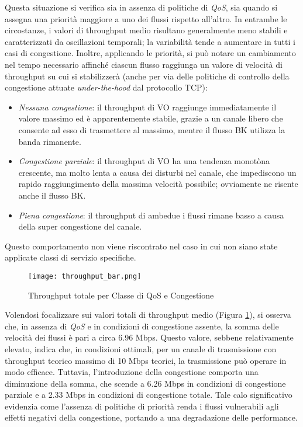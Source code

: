 Questa situazione si verifica sia in assenza di politiche di \textit{QoS}, sia quando si assegna una priorità maggiore a uno dei flussi rispetto all'altro. In entrambe le circostanze, i valori di throughput medio risultano generalmente meno stabili e caratterizzati da oscillazioni temporali; la variabilità tende a aumentare in tutti i casi di congestione. Inoltre, applicando le priorità, si può notare un cambiamento nel tempo necessario affinché ciascun flusso raggiunga un valore di velocità di throughput su cui si stabilizzerà (anche per via delle politiche di controllo della congestione attuate \textit{under-the-hood} dal protocollo TCP):
\begin{itemize}
    \item \textit{Nessuna congestione}: il throughput di VO raggiunge immediatamente il valore massimo ed è apparentemente stabile, grazie a un canale libero che consente ad esso di trasmettere al massimo, mentre il flusso BK utilizza la banda rimanente.
    \item \textit{Congestione parziale}: il throughput di VO ha una tendenza monotòna crescente, ma molto lenta a causa dei disturbi nel canale, che impediscono un rapido raggiungimento della massima velocità possibile; ovviamente ne risente anche il flusso BK.
    \item \textit{Piena congestione}: il throughput di ambedue i flussi rimane basso a causa della super congestione del canale.
\end{itemize}

\noindent Questo comportamento non viene riscontrato nel caso in cui non siano state applicate classi di servizio specifiche.

\begin{figure}[h!]
    \centering
    \texttt{[image: throughput\_bar.png]}
    \caption{Throughput totale per Classe di QoS e Congestione}
    \label{fig:throughput_bar}
\end{figure}

Volendosi focalizzare sui valori totali di throughput medio (Figura \ref{fig:throughput_bar}), si osserva che, in assenza di \textit{QoS} e in condizioni di congestione assente, la somma delle velocità dei flussi è pari a circa 6.96 Mbps. Questo valore, sebbene relativamente elevato, indica che, in condizioni ottimali, per un canale di trasmissione con throughput teorico massimo di 10 Mbps teorici, la trasmissione può operare in modo efficace. Tuttavia, l'introduzione della congestione comporta una diminuzione della somma, che scende a 6.26 Mbps in condizioni di congestione parziale e a 2.33 Mbps in condizioni di congestione totale. Tale calo significativo evidenzia come l'assenza di politiche di priorità renda i flussi vulnerabili agli effetti negativi della congestione, portando a una degradazione delle performance.


